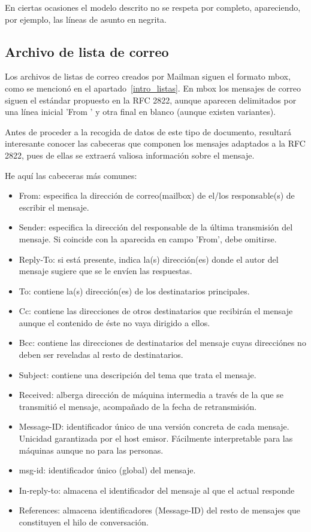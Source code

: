 En ciertas ocasiones el modelo descrito no se respeta por completo,
apareciendo, por ejemplo, las líneas de asunto en negrita.


\subsection{Archivo de lista de correo}
Los archivos de listas de correo creados por Mailman siguen el formato mbox,
como se mencionó en el apartado~\ref{intro_listas}. En mbox
los mensajes de correo siguen el estándar propuesto en la
RFC 2822, aunque aparecen delimitados por una línea inicial
'From ' y otra final en blanco (aunque existen variantes).

Antes de proceder a la recogida de datos de este tipo de documento,
resultará interesante conocer las cabeceras que componen los
mensajes adaptados a la RFC 2822, pues de ellas se extraerá valiosa
información sobre el mensaje.

He aquí las cabeceras más comunes:
\begin{itemize}
\item
From: especifica la dirección de correo(mailbox) de el/los responsable(s)
de escribir el mensaje.
\item
Sender: especifica la dirección del responsable de la última transmisión
del mensaje. Si coincide con la aparecida en campo 'From', debe omitirse.
\item
Reply-To: si está presente, indica la(s) dirección(es) donde el autor del
mensaje sugiere que se le envíen las respuestas.
\item
To: contiene la(s) dirección(es) de los destinatarios principales.
\item
Cc: contiene las direcciones de otros destinatarios que recibirán el mensaje
aunque el contenido de éste no vaya dirigido a ellos.
\item
Bcc: contiene las direcciones de destinatarios del mensaje cuyas direcciónes
no deben ser reveladas al resto de destinatarios.
\item
Subject: contiene una descripción del tema que trata el mensaje.
\item
Received: alberga dirección de máquina intermedia a través de la que se
transmitió el mensaje, acompañado de la fecha de retransmisión.
\item
Message-ID: identificador único de una versión concreta de cada mensaje.
Unicidad garantizada por el host emisor.
Fácilmente interpretable para las máquinas aunque no para las personas.
\item
msg-id: identificador único (global) del mensaje.
\item
In-reply-to: almacena el identificador del mensaje al que el actual responde
\item
References: almacena identificadores (Message-ID) del resto de mensajes que
constituyen el hilo de conversación.
\end{itemize}

